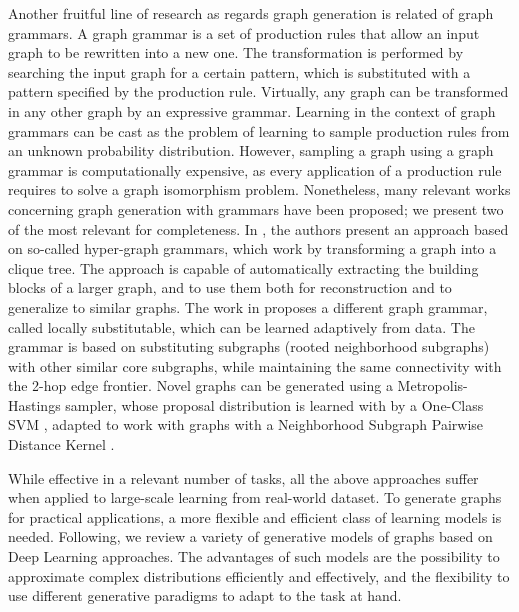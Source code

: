 Another fruitful line of research as regards graph generation is related of graph grammars. A graph grammar is a set of production rules that allow an input graph to be rewritten into a new one. The transformation is performed by searching the input graph for a certain pattern, which is substituted with a pattern specified by the production rule. Virtually, any graph can be transformed in any other graph by an expressive grammar. Learning in the context of graph grammars can be cast as the problem of learning to sample production rules from an unknown probability distribution. However, sampling a graph using a graph grammar is computationally expensive, as every application of a production rule requires to solve a graph isomorphism problem. Nonetheless, many relevant works concerning graph generation with grammars have been proposed; we present two of the most relevant for completeness. In \cite{aguinaga2016hypergraphgrammar}, the authors present an approach based on so-called hyper-graph grammars, which work by transforming a graph into a clique tree. The approach is capable of automatically extracting the building blocks of a larger graph, and to use them both for reconstruction and to generalize to similar graphs. The work in \cite{costa2017graphgrammarmcmc} proposes a different graph grammar, called locally substitutable, which can be learned adaptively from data. The grammar is based on substituting  subgraphs (rooted neighborhood subgraphs) with other similar core subgraphs, while maintaining the same connectivity with the 2-hop edge frontier. Novel graphs can be generated using a Metropolis-Hastings sampler, whose proposal distribution is learned with by a One-Class SVM \cite{skolkopf2001oneclasssvm}, adapted to work with graphs with a Neighborhood Subgraph Pairwise Distance Kernel \cite{costa2010nspdk}.

While effective in a relevant number of tasks, all the above approaches suffer when applied to large-scale learning from real-world dataset. To generate graphs for practical applications, a more flexible and efficient class of learning models is needed. Following, we review a variety of generative models of graphs based on Deep Learning approaches. The advantages of such models are the possibility to approximate complex distributions efficiently and effectively, and the flexibility to use different generative paradigms to adapt to the task at hand.

